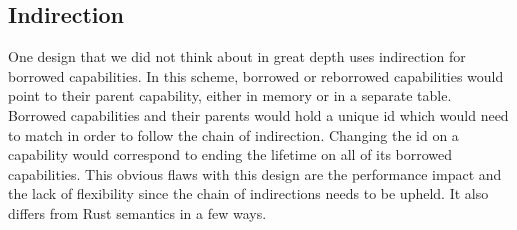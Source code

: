 \subsection{Indirection}
One design that we did not think about in great depth uses indirection for borrowed capabilities.
In this scheme, borrowed or reborrowed capabilities would point to their parent capability, either in memory or in a separate table.
Borrowed capabilities and their parents would hold a unique id which would need to match in order to follow the chain of indirection.
Changing the id on a capability would correspond to ending the lifetime on all of its borrowed capabilities.
This obvious flaws with this design are the performance impact and the lack of flexibility since the chain of indirections needs to be upheld.
It also differs from Rust semantics in a few ways.

